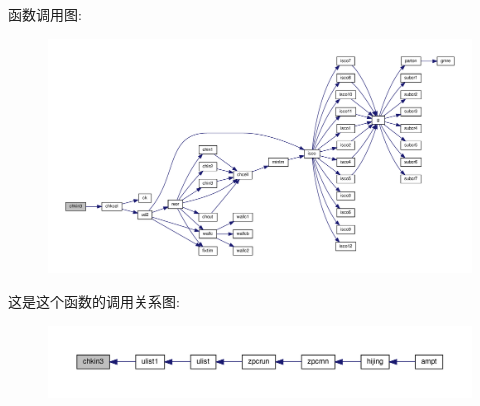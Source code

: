 函数调用图\+:
\nopagebreak
\begin{figure}[H]
\begin{center}
\leavevmode
\includegraphics[width=350pt]{chkin3_8f90_aa60153be44118756d9a942977f2214e0_cgraph}
\end{center}
\end{figure}
这是这个函数的调用关系图\+:
\nopagebreak
\begin{figure}[H]
\begin{center}
\leavevmode
\includegraphics[width=350pt]{chkin3_8f90_aa60153be44118756d9a942977f2214e0_icgraph}
\end{center}
\end{figure}
